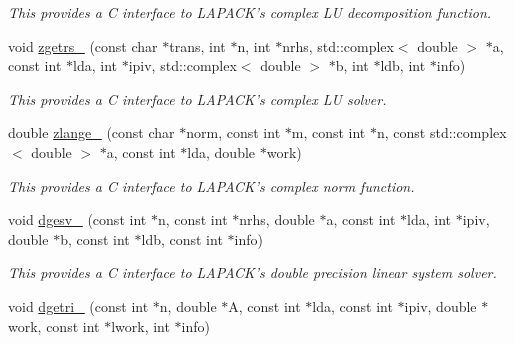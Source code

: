 \begin{DoxyCompactItemize}
\begin{DoxyCompactList}\small\item\em This provides a C interface to L\-A\-P\-A\-C\-K's complex L\-U decomposition function. \end{DoxyCompactList}\item 
\hypertarget{namespacekeycpp_abbe4322276dcdb7d864e85854b5b90f2}{void \hyperlink{namespacekeycpp_abbe4322276dcdb7d864e85854b5b90f2}{zgetrs\-\_\-} (const char $\ast$trans, int $\ast$n, int $\ast$nrhs, std\-::complex$<$ double $>$ $\ast$a, const int $\ast$lda, int $\ast$ipiv, std\-::complex$<$ double $>$ $\ast$b, int $\ast$ldb, int $\ast$info)}\label{namespacekeycpp_abbe4322276dcdb7d864e85854b5b90f2}

\begin{DoxyCompactList}\small\item\em This provides a C interface to L\-A\-P\-A\-C\-K's complex L\-U solver. \end{DoxyCompactList}\item 
\hypertarget{namespacekeycpp_a1477c910b07baef984fe8528c29b2774}{double \hyperlink{namespacekeycpp_a1477c910b07baef984fe8528c29b2774}{zlange\-\_\-} (const char $\ast$norm, const int $\ast$m, const int $\ast$n, const std\-::complex$<$ double $>$ $\ast$a, const int $\ast$lda, double $\ast$work)}\label{namespacekeycpp_a1477c910b07baef984fe8528c29b2774}

\begin{DoxyCompactList}\small\item\em This provides a C interface to L\-A\-P\-A\-C\-K's complex norm function. \end{DoxyCompactList}\item 
\hypertarget{namespacekeycpp_a12719f4b48de048f9642066666a920bd}{void \hyperlink{namespacekeycpp_a12719f4b48de048f9642066666a920bd}{dgesv\-\_\-} (const int $\ast$n, const int $\ast$nrhs, double $\ast$a, const int $\ast$lda, int $\ast$ipiv, double $\ast$b, const int $\ast$ldb, const int $\ast$info)}\label{namespacekeycpp_a12719f4b48de048f9642066666a920bd}

\begin{DoxyCompactList}\small\item\em This provides a C interface to L\-A\-P\-A\-C\-K's double precision linear system solver. \end{DoxyCompactList}\item 
\hypertarget{namespacekeycpp_af92d0d887ae48cc4222f7167232a7f82}{void \hyperlink{namespacekeycpp_af92d0d887ae48cc4222f7167232a7f82}{dgetri\-\_\-} (const int $\ast$n, double $\ast$A, const int $\ast$lda, const int $\ast$ipiv, double $\ast$work, const int $\ast$lwork, int $\ast$info)}\label{namespacekeycpp_af92d0d887ae48cc4222f7167232a7f82}


\end{DoxyCompactItemize}
